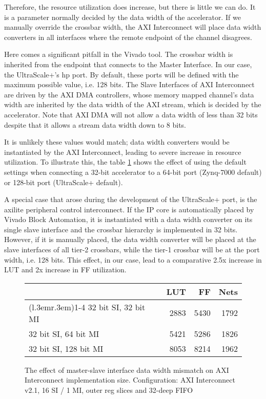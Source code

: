 Therefore, the resource utilization does increase, but there is little we can do.
It is a parameter normally decided by the data width of the accelerator.
If we manually override the crossbar width, the AXI Interconnect will place
data width converters in all interfaces where the remote endpoint of the channel disagrees.

Here comes a significant pitfall in the Vivado tool. The crossbar width is inherited
from the endpoint that connects to the Master Interface. In our case, the UltraScale+'s \gls{hp} port.
By default, these ports will be defined with the maximum possible value, i.e. 128 bits.
The Slave Interfaces of AXI Interconnect are driven by the AXI DMA controllers,
whose memory mapped channel's data width are inherited by the data width of the AXI stream,
which is decided by the accelerator. Note that AXI DMA will not allow a data width of less
than 32 bits despite that it allows a stream data width down to 8 bits.

It is unlikely these values would match; data width converters would be instantiated by
the AXI Interconnect, leading to severe increase in resource utilization.
To illustrate this, the table \ref{tab:int-dw} shows the effect of using the default
settings when connecting a 32-bit accelerator to a 64-bit port (Zynq-7000 default)
or 128-bit port (UltraScale+ default).

A special case that arose during the development of the UltraScale+ port,
is the \gls{axilite} peripheral control interconnect.
If the IP core is automatically placed by Vivado Block Automation,
it is instantiated with a data width converter on its single slave interface
and the crossbar hierarchy is implemented in 32 bits.
However, if it is manually placed, the data width converter will be placed
at the slave interfaces of all tier-2 crossbars, while the tier-1 crossbar will be
at the port width, i.e. 128 bits.
This effect, in our case, lead to a comparative 2.5x increase in LUT and 2x increase in FF utilization.


\begin{figure}[ht!]
\centering
\begin{tabular}{lrrr}
\toprule
			& LUT	& FF	& Nets \\
\cmidrule(l{.3em}r{.3em}){1-4}
32 bit SI, 32 bit MI	& 2883 & 5430 & 1792 \\
32 bit SI, 64 bit MI	& 5421	&5286	&1826	\\
32 bit SI, 128 bit MI	& 8053	&8214	&1962	\\
\bottomrule
\end{tabular}
\caption{The effect of master-slave interface data width mismatch on AXI Interconnect implementation size.
	Configuration: AXI Interconnect v2.1, 16 SI / 1 MI, outer reg slices and 32-deep FIFO}
\label{tab:int-dw}
\end{figure}

